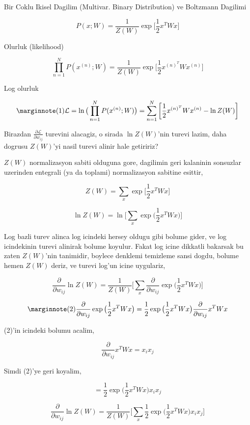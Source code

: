 \documentclass[12pt,fleqn]{article}\usepackage{../common}
\begin{document}
Bir Coklu Ikisel Dagilim (Multivar. Binary Distribution) ve Boltzmann Dagilimi

$$  
P(x;W) = \frac{1}{Z(W)} 
\exp \bigg[ \frac{1}{2} x^T W x \bigg]
$$

Olurluk (likelihood)

$$  
\prod _{n=1}^{N} P(x^{(n)};W) = \frac{1}{Z(W)} 
\exp \bigg[ \frac{1}{2} x^{(n)^T} W x^{(n)} \bigg]
$$

Log olurluk

$$  
\mlabel{1}
\mathcal{L} = \ln \big( \prod _{n=1}^{N} P(x^{(n)};W) \big) = 
\sum _{n=1}^{N} \bigg[ \frac{1}{2} x^{(n)^T} W x^{(n)} - \ln Z(W) \bigg]
$$

Birazdan $\frac{\partial \mathcal L}{\partial w_{ij}}$ turevini alacagiz, o
sirada $\ln Z(W)$'nin turevi lazim, daha dogrusu $Z(W)$'yi nasil turevi
alinir hale getiririz?

$Z(W)$ normalizasyon sabiti olduguna gore, dagilimin geri kalaninin
sonsuzlar uzerinden entegrali (ya da toplami) normalizasyon sabitine
esittir, 

$$ 
Z(W) = \sum_x  \exp \bigg[ \frac{1}{2} x^T W x \bigg]
 $$

$$ 
\ln Z(W) = \ln \bigg[ \sum_x  \exp \big( \frac{1}{2} x^T W x \big) \bigg]
 $$

Log bazli turev alinca log icindeki hersey oldugu gibi bolume gider, ve log
icindekinin turevi alinirak bolume koyulur. Fakat log icine dikkatli
bakarsak bu zaten $Z(W)$'nin tanimidir, boylece denklemi temizleme sansi
dogdu, bolume hemen $Z(W)$ deriz, ve turevi log'un icine uygulariz,


$$ 
\frac{\partial}{\partial w_{ij}} \ln Z(W) = 
\frac{1}{Z(W)}
\bigg[ 
\sum_x \frac{\partial}{\partial w_{ij}} \exp \big( \frac{1}{2} x^T W x \big) 
\bigg]
 $$


$$ 
\mlabel{2}
\frac{\partial}{\partial w_{ij}} \exp \big( \frac{1}{2} x^T W x \big)  = 
\frac{1}{2}  \exp \big( \frac{1}{2} x^T W x \big) 
\frac{\partial}{\partial w_{ij}}x^T W x
$$

(2)'in icindeki bolumu acalim,

$$ \frac{\partial}{\partial w_{ij}}x^T W x = x_i x_j $$

Simdi (2)'ye geri koyalim,

$$ =  \frac{1}{2}  \exp \big( \frac{1}{2} x^T W x \big) x_i x_j$$

$$ 
\frac{\partial}{\partial w_{ij}} \ln Z(W) = 
\frac{1}{Z(W)}
\bigg[ 
\sum_x \frac{1}{2}  \exp \big( \frac{1}{2} x^T W x \big) x_i x_j
\bigg]
$$
\end{document}
